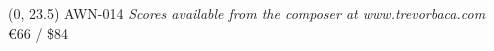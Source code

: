\documentclass[10pt]{article}
\begin{document}
\begin{textblock}{23}(0, 23.5)
AWN-014 \hfill
\textit{Scores available from the composer at www.trevorbaca.com} \hfill
\euro 66 / \$84
\end{textblock}
\end{document}
